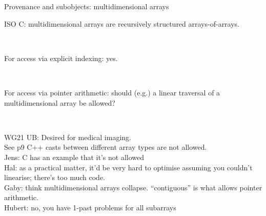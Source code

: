 \documentclass[ignorenonframetext,aspectratio=169]{beamer}
\newcommand{\ub}[1]{{\color{purple}WG21 UB: #1}}
\begin{document}
\begin{frame}{Provenance and subobjects: multidimensional arrays}

  ISO C:  multidimensional arrays are recursively structured arrays-of-arrays.

  \
  
  For access via explicit indexing: yes.

\ 

  For access via pointer arithmetic: should (e.g.) a linear traversal of a multidimensional array be allowed?

  \

  \ub{Desired for medical imaging.\\
    See p9 C++ casts between different array types are not allowed.\\
    Jens: C has an example that it's not allowed\\
    Hal: as a practical matter, it'd be very hard to optimise assuming you couldn't linearise; there's too much code.\\
    Gaby: think multidimensional arrays collapse. ``contiguous'' is what allows pointer arithmetic.\\
    Hubert: no, you have 1-past problems for all subarrays
    }
  
\end{frame}
\end{document}
